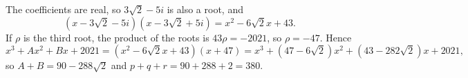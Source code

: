 The coefficients are real, so $3\sqrt2-5i$ is also a root, and
\[\left(x-3\sqrt2-5i\right)\left(x-3\sqrt2+5i\right)=x^2-6\sqrt2x+43.\]
If $\rho$ is the third root, the product of the roots is $43\rho=-2021$, so $\rho=-47$. Hence
\[x^3+Ax^2+Bx+2021=\left(x^2-6\sqrt2x+43\right)(x+47)=x^3+\left(47-6\sqrt2\right)x^2+\left(43-282\sqrt2\right)x+2021,\]
so $A+B=90-288\sqrt2$ and $p+q+r=90+288+2=\boxed{380}$.
